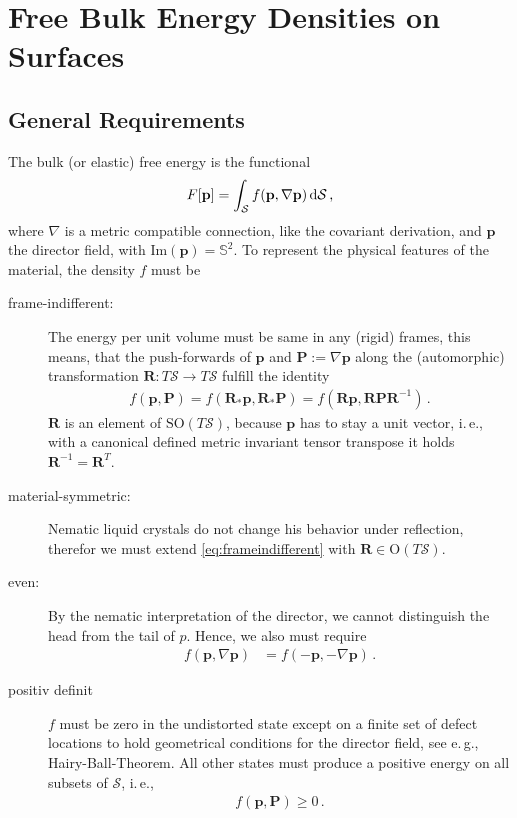 \documentclass{scrartcl}
\newcommand{\ie}{i.\,e.}%
\newcommand{\eg}{e.\,g.}%
\newcommand{\formComma}{\,\text{,}}
\newcommand{\formPeriod}{\,\text{.}}
\newcommand{\dif}{\textup{d}}
\newcommand{\pb}{\mathbf{p}}%
\newcommand{\Pb}{\mathbf{P}}%
\newcommand{\dS}{\,\dif{\surf}}
\newcommand{\surf}{\mathcal{S}}
\newcommand{\Rb}{\mathbf{R}}
\begin{document}
  \section{Free Bulk Energy Densities on Surfaces}

    \subsection{General Requirements}
      The bulk (or elastic) free energy is the functional
      \begin{align}
        F[\pb] = \int_{\surf} f(\pb,\nabla\pb) \dS \formComma
      \end{align}
      where  \( \nabla \) is a metric compatible connection, like the covariant derivation, and 
      \( \pb \) the director field, with \( \text{Im}(\pb)=\mathds{S}^{2} \).
      To represent the physical features of the material, 
      the density \( f \) must be
      \begin{description}
        \item[frame-indifferent:] The energy per unit volume must be same in any (rigid) frames,
          this means, that the push-forwards of \( \pb \) and \( \Pb:=\nabla\pb \) along the (automorphic) transformation
          \( \Rb:T\surf \rightarrow T\surf \) fulfill the identity 
          \begin{align}\label{eq:frameindifferent}
            f(\pb,\Pb) = f(\Rb_{*}\pb, \Rb_{*}\Pb) = f(\Rb\pb, \Rb\Pb\Rb^{-1})\formPeriod
          \end{align}
          \(\Rb\) is an element of \( \text{SO}(T\surf) \), because \( \pb \) has to stay a unit vector,
          \ie, with a canonical defined metric invariant tensor transpose it holds \( \Rb^{-1} = \Rb^{T} \).
        \item[material-symmetric:] Nematic liquid crystals do not change his behavior under reflection,
          therefor we must extend \eqref{eq:frameindifferent} with \( \Rb\in\text{O}(T\surf) \).
        \item[even:] By the nematic interpretation of the director, 
           we cannot distinguish the head from the tail of \( p \).
           Hence, we also must require 
           \begin{align}
             f(\pb,\nabla\pb) &= f(-\pb,-\nabla\pb)\formPeriod
           \end{align}
        \item[positiv definit] \( f \) must be zero in the undistorted state except on a finite set of defect locations to hold geometrical
        conditions for the director field, see \eg, Hairy-Ball-Theorem.
        All other states must produce a positive energy on all subsets of \( \surf \), \ie,
        \begin{align}
          f(\pb,\Pb) \ge 0 \formPeriod
        \end{align}
      \end{description}
\end{document}
